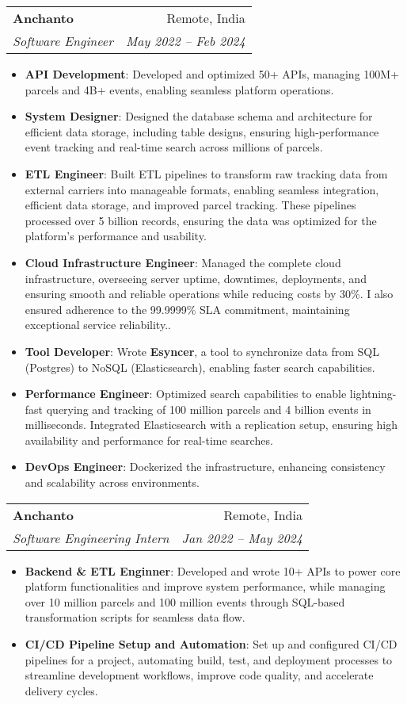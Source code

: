 \documentclass[letterpaper,11pt]{article}
\makeatletter
\newcommand{\resumeItem}[2]{
  \item\small{
    \textbf{#1}{: #2 \vspace{-2pt}}
  }
}
\newcommand{\resumeSubheading}[4]{
  \vspace{-1pt}\item
    \begin{tabular*}{0.97\textwidth}[t]{l@{\extracolsep{\fill}}r}
      \textbf{#1} & #2 \\
      \textit{\small#3} & \textit{\small #4} \\
    \end{tabular*}\vspace{-5pt}
}
\newcommand{\resumeItemListStart}{\begin{itemize}}
\newcommand{\resumeItemListEnd}{\end{itemize}\vspace{-5pt}}
\makeatother
\begin{document}
    \resumeSubheading
      {Anchanto}{Remote, India}
      {Software Engineer}{May 2022 -- Feb 2024}
      \resumeItemListStart
        \resumeItem{API Development}
          {Developed and optimized 50+ APIs, managing 100M+ parcels and 4B+ events, enabling seamless platform operations.}
        \resumeItem{System Designer}
          {Designed the database schema and architecture for efficient data storage, including table designs, ensuring high-performance event tracking and real-time search across millions of parcels.}
        \resumeItem{ETL Engineer}
          {Built ETL pipelines to transform raw tracking data from external carriers into manageable formats, enabling seamless integration, efficient data storage, and improved parcel tracking. These pipelines processed over 5 billion records, ensuring the data was optimized for the platform's performance and usability.}
        \resumeItem{Cloud Infrastructure Engineer}
          {Managed the complete cloud infrastructure, overseeing server uptime, downtimes, deployments, and ensuring smooth and reliable operations while reducing costs by 30\%. I also ensured adherence to the 99.9999\% SLA commitment, maintaining exceptional service reliability..}
        \resumeItem{Tool Developer}
          {Wrote \textbf{Esyncer}, a tool to synchronize data from SQL (Postgres) to NoSQL (Elasticsearch), enabling faster search capabilities.}
        \resumeItem{Performance Engineer}
          {Optimized search capabilities to enable lightning-fast querying and tracking of 100 million parcels and 4 billion events in milliseconds. Integrated Elasticsearch with a replication setup, ensuring high availability and performance for real-time searches.}
        \resumeItem{DevOps Engineer}
          {Dockerized the infrastructure, enhancing consistency and scalability across environments.}
      \resumeItemListEnd
    \resumeSubheading
      {Anchanto}{Remote, India}
      {Software Engineering Intern}{Jan 2022 -- May 2024}
      \resumeItemListStart
        \resumeItem{Backend \& ETL Enginner}
          {Developed and wrote 10+ APIs to power core platform functionalities and improve system performance, while managing over 10 million parcels and 100 million events through SQL-based transformation scripts for seamless data flow.}
        \resumeItem{CI/CD Pipeline Setup and Automation}
          {Set up and configured CI/CD pipelines for a project, automating build, test, and deployment processes to streamline development workflows, improve code quality, and accelerate delivery cycles.}
       \resumeItemListEnd
\end{document}
